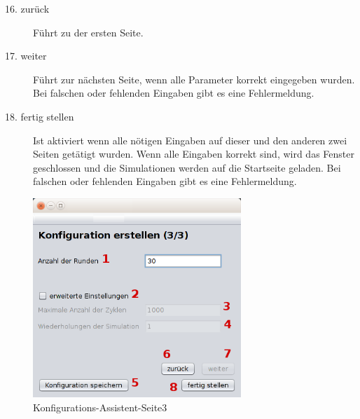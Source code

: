 \begin{description}
\item[16. zurück] Führt zu der ersten Seite.

\item[17. weiter] Führt zur nächsten Seite, wenn alle Parameter korrekt eingegeben wurden. Bei falschen oder fehlenden Eingaben gibt es eine Fehlermeldung.

\item[18. fertig stellen] Ist aktiviert wenn alle nötigen Eingaben auf dieser und den anderen zwei Seiten getätigt wurden. Wenn alle Eingaben korrekt sind, wird das Fenster geschlossen und die Simulationen werden auf die Startseite geladen. Bei falschen oder fehlenden Eingaben gibt es eine Fehlermeldung.

\end{description}

\pagebreak

\begin{figure}[hp] 
  \centering
     \includegraphics[width=0.7\textwidth]{GUI_Entwurf/WizardFenster3.png}
  \caption{Konfigurations-Assistent-Seite3}
  \label{fig:Bild4}
\end{figure}

